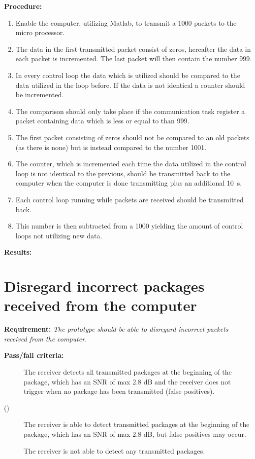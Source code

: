 		
\textbf{Procedure:}\\

\begin{enumerate}
	\item Enable the computer, utilizing Matlab, to transmit a 1000 packets to the micro processor.
	\item The data in the first transmitted packet consist of zeros, hereafter the data in each packet is incremented. The last packet will then contain the number 999. 
	\item In every control loop the data which is utilized should be compared to the data utilized in the loop before. If the data is not identical a counter should be incremented. 
	\item The comparison should only take place if the communication task register a packet containing data which is less or equal to than 999.
	\item The first packet consisting of zeros should not be compared to an old packets (as there is none) but is instead compared to the number 1001. 
	\item The counter, which is incremented each time the data utilized in the control loop is not identical to the previous, should be transmitted back to the computer when the computer is done transmitting plus an additional \SI{10}{s}.
	\item Each control loop running while packets are received should be transmitted back.
	\item This number is then subtracted from a 1000 yielding the amount of control loops not utilizing new data.
\end{enumerate} 

\textbf{Results:}

\newpage

\section{Disregard incorrect packages received from the computer}
\textbf{Requirement:}
\textit{The prototype should be able to disregard incorrect packets received from the computer.}

\textbf{Pass/fail criteria:}
	\begin{description}
	\item[  ] The receiver detects all transmitted packages at the beginning of the package, which has an SNR of max 2.8 dB and the receiver does not trigger when no package has been transmitted (false positives).
	\item[()]The receiver is able to detect transmitted packages at the beginning of the package, which has an SNR of max 2.8 dB, but false positives may occur.
	\item[  \phantom{)}]The receiver is not able to detect any transmitted packages.
	\end{description}


